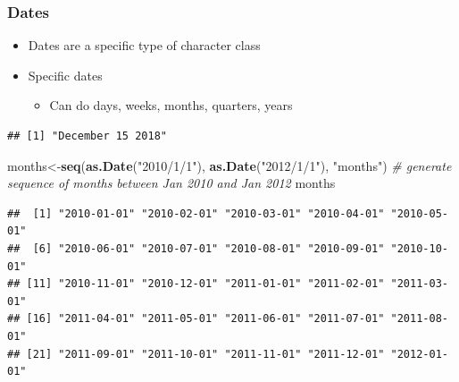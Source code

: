 \documentclass[]{book}
\newenvironment{Shaded}{\begin{snugshade}}{\end{snugshade}}
\newcommand{\KeywordTok}[1]{\textcolor[rgb]{0.13,0.29,0.53}{\textbf{#1}}}
\newcommand{\DataTypeTok}[1]{\textcolor[rgb]{0.13,0.29,0.53}{#1}}
\newcommand{\StringTok}[1]{\textcolor[rgb]{0.31,0.60,0.02}{#1}}
\newcommand{\CommentTok}[1]{\textcolor[rgb]{0.56,0.35,0.01}{\textit{#1}}}
\newcommand{\NormalTok}[1]{#1}
\providecommand{\tightlist}{%
  \setlength{\itemsep}{0pt}\setlength{\parskip}{0pt}}
\theoremstyle{definition}
\theoremstyle{definition}
\theoremstyle{definition}
\theoremstyle{remark}
\begin{document}
\subsubsection{Dates}\label{dates}

\begin{itemize}
\tightlist
\item
  Dates are a specific type of character class
\item
  Specific dates

  \begin{itemize}
  \tightlist
  \item
    Can do days, weeks, months, quarters, years
  \end{itemize}
\end{itemize}

\begin{Shaded}
\end{Shaded}

\begin{verbatim}
## [1] "December 15 2018"
\end{verbatim}

\begin{Shaded}
\begin{Highlighting}[]
\NormalTok{months<-}\KeywordTok{seq}\NormalTok{(}\KeywordTok{as.Date}\NormalTok{(}\StringTok{"2010/1/1"}\NormalTok{), }\KeywordTok{as.Date}\NormalTok{(}\StringTok{"2012/1/1"}\NormalTok{), }\StringTok{"months"}\NormalTok{) }\CommentTok{# generate sequence of months between Jan 2010 and Jan 2012}
\NormalTok{months}
\end{Highlighting}
\end{Shaded}

\begin{verbatim}
##  [1] "2010-01-01" "2010-02-01" "2010-03-01" "2010-04-01" "2010-05-01"
##  [6] "2010-06-01" "2010-07-01" "2010-08-01" "2010-09-01" "2010-10-01"
## [11] "2010-11-01" "2010-12-01" "2011-01-01" "2011-02-01" "2011-03-01"
## [16] "2011-04-01" "2011-05-01" "2011-06-01" "2011-07-01" "2011-08-01"
## [21] "2011-09-01" "2011-10-01" "2011-11-01" "2011-12-01" "2012-01-01"
\end{verbatim}
\end{document}
